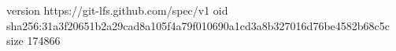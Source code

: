 version https://git-lfs.github.com/spec/v1
oid sha256:31a3f20651b2a29cad8a105f4a79f010690a1cd3a8b327016d76be4582b68c5c
size 174866
